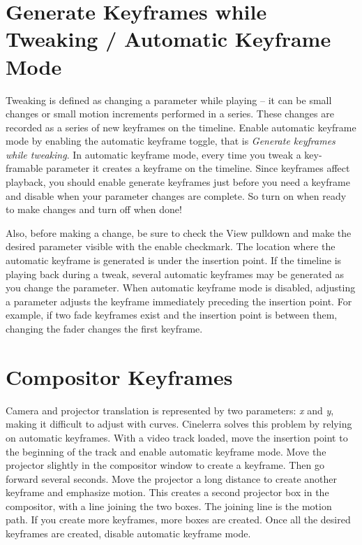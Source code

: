 {\section{Generate Keyframes while Tweaking / Automatic Keyframe Mode}%
\label{sec:generate_keyframe_tweaking}

Tweaking is defined as changing a parameter while playing -- it can be small changes or small motion increments performed in a series.  These changes are recorded as a series of new keyframes on the timeline.  Enable automatic keyframe mode by enabling the automatic keyframe toggle, that is \textit{Generate keyframes while tweaking}.  In automatic keyframe mode, every time you tweak a key-framable parameter it creates a keyframe on the timeline.  Since keyframes affect playback, you should enable generate keyframes just before you need a keyframe and disable when your parameter changes are complete.  So turn on when ready to make changes and turn off when done!

Also, before making a change, be sure to check the View pulldown and make the desired parameter visible with the enable checkmark.  The location where the automatic keyframe is generated is under the insertion point.  If the timeline is playing back during a tweak, several automatic keyframes may be generated as you change the parameter.  When automatic keyframe mode is disabled, adjusting a parameter adjusts the keyframe immediately preceding the insertion point.  For example, if two fade keyframes exist and the insertion point is between them, changing the fader changes the first keyframe.

\section{Compositor Keyframes}%
\label{sec:compositor_keyframes}

Camera and projector translation is represented by two parameters: \textit{x} and \textit{y}, making it difficult to adjust with curves.  Cinelerra solves this problem by relying on automatic keyframes.  With a video track loaded, move the insertion point to the beginning of the track and enable automatic keyframe mode.  Move the projector slightly in the compositor window to create a keyframe.  Then go forward several seconds.  Move the projector a long distance to create another keyframe and emphasize motion.  This creates a second projector box in the compositor, with a line joining the two boxes. The joining line is the motion path.  If you create more keyframes, more boxes are created.  Once all the desired keyframes are created, disable automatic keyframe mode.

}

